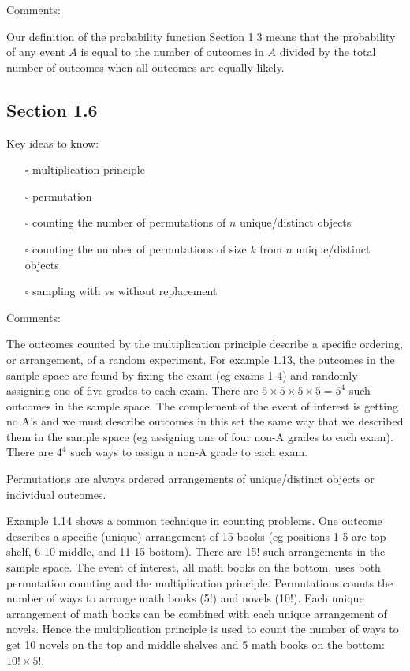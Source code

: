 \documentclass[
  letterpaper,
]{scrbook}
\providecommand{\tightlist}{%
  \setlength{\itemsep}{0pt}\setlength{\parskip}{0pt}}\usepackage{longtable,booktabs,array}
\begin{document}
Comments:

Our definition of the probability function Section 1.3 means that the
probability of any event \(A\) is equal to the number of outcomes in
\(A\) divided by the total number of outcomes when all outcomes are
equally likely.

\subsection*{Section 1.6}\label{section-1.6}

Key ideas to know:

\begin{itemize}
\tightlist
\item[$\square$]
  multiplication principle
\item[$\square$]
  permutation
\item[$\square$]
  counting the number of permutations of \(n\) unique/distinct objects
\item[$\square$]
  counting the number of permutations of size \(k\) from \(n\)
  unique/distinct objects
\item[$\square$]
  sampling with vs without replacement
\end{itemize}

Comments:

The outcomes counted by the multiplication principle describe a specific
ordering, or arrangement, of a random experiment. For example 1.13, the
outcomes in the sample space are found by fixing the exam (eg exams 1-4)
and randomly assigning one of five grades to each exam. There are
\(5\times5\times5\times5 = 5^4\) such outcomes in the sample space. The
complement of the event of interest is getting no A's and we must
describe outcomes in this set the same way that we described them in the
sample space (eg assigning one of four non-A grades to each exam). There
are \(4^4\) such ways to assign a non-A grade to each exam.

Permutations are always ordered arrangements of unique/distinct objects
or individual outcomes.

Example 1.14 shows a common technique in counting problems. One outcome
describes a specific (unique) arrangement of 15 books (eg positions 1-5
are top shelf, 6-10 middle, and 11-15 bottom). There are 15! such
arrangements in the sample space. The event of interest, all math books
on the bottom, uses both permutation counting and the multiplication
principle. Permutations counts the number of ways to arrange math books
(5!) and novels (10!). Each unique arrangement of math books can be
combined with each unique arrangement of novels. Hence the
multiplication principle is used to count the number of ways to get 10
novels on the top and middle shelves and 5 math books on the bottom:
\(10! \times 5!\).
\end{document}
